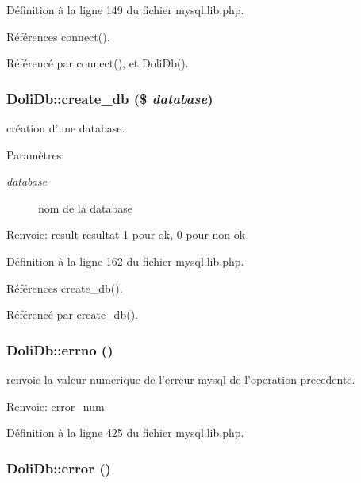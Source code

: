 D\'{e}finition \`{a} la ligne 149 du fichier mysql.lib.php.

R\'{e}f\'{e}rences connect().

R\'{e}f\'{e}renc\'{e} par connect(), et Doli\-Db().\hypertarget{classDoliDb_a3}{
\subsubsection[create\_\-db]{\setlength{\rightskip}{0pt plus 5cm}Doli\-Db::create\_\-db (\$ {\em database})}}
\label{classDoliDb_a3}


cr\'{e}ation d'une database. 

\begin{Desc}
\item[Param\`{e}tres:]
\begin{description}
\item[{\em database}]nom de la database \end{description}
\end{Desc}
\begin{Desc}
\item[Renvoie:]result resultat 1 pour ok, 0 pour non ok \end{Desc}


D\'{e}finition \`{a} la ligne 162 du fichier mysql.lib.php.

R\'{e}f\'{e}rences create\_\-db().

R\'{e}f\'{e}renc\'{e} par create\_\-db().\hypertarget{classDoliDb_a24}{
\subsubsection[errno]{\setlength{\rightskip}{0pt plus 5cm}Doli\-Db::errno ()}}
\label{classDoliDb_a24}


renvoie la valeur numerique de l'erreur mysql de l'operation precedente. 

\begin{Desc}
\item[Renvoie:]error\_\-num \end{Desc}


D\'{e}finition \`{a} la ligne 425 du fichier mysql.lib.php.\hypertarget{classDoliDb_a23}{
\subsubsection[error]{\setlength{\rightskip}{0pt plus 5cm}Doli\-Db::error ()}}
\label{classDoliDb_a23}


